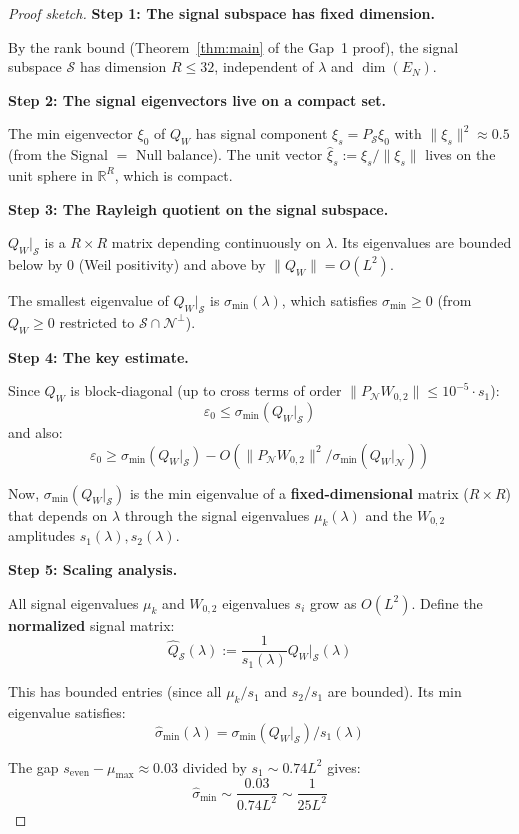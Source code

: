 \documentclass[11pt]{article}
\begin{document}
\begin{proof}[Proof sketch]
\textbf{Step 1: The signal subspace has fixed dimension.}

By the rank bound (Theorem~\ref{thm:main} of the Gap~1 proof), the signal subspace $\mathcal{S}$ has dimension $R \leq 32$, independent of $\lambda$ and $\dim(E_N)$.

\textbf{Step 2: The signal eigenvectors live on a compact set.}

The min eigenvector $\xi_0$ of $Q_W$ has signal component $\xi_s = P_\mathcal{S}\xi_0$ with $\|\xi_s\|^2 \approx 0.5$ (from the Signal $=$ Null balance). The unit vector $\hat{\xi}_s := \xi_s/\|\xi_s\|$ lives on the unit sphere in $\mathbb{R}^R$, which is compact.

\textbf{Step 3: The Rayleigh quotient on the signal subspace.}

$Q_W|_\mathcal{S}$ is a $R \times R$ matrix depending continuously on $\lambda$. Its eigenvalues are bounded below by $0$ (Weil positivity) and above by $\|Q_W\| = O(L^2)$.

The smallest eigenvalue of $Q_W|_\mathcal{S}$ is $\sigma_{\min}(\lambda)$, which satisfies $\sigma_{\min} \geq 0$ (from $Q_W \geq 0$ restricted to $\mathcal{S} \cap \mathcal{N}^\perp$).

\textbf{Step 4: The key estimate.}

Since $Q_W$ is block-diagonal (up to cross terms of order $\|P_\mathcal{N}W_{0,2}\| \leq 10^{-5} \cdot s_1$):
\[
\varepsilon_0 \leq \sigma_{\min}(Q_W|_\mathcal{S})
\]
and also:
\[
\varepsilon_0 \geq \sigma_{\min}(Q_W|_\mathcal{S}) - O(\|P_\mathcal{N}W_{0,2}\|^2 / \sigma_{\min}(Q_W|_\mathcal{N}))
\]

Now, $\sigma_{\min}(Q_W|_\mathcal{S})$ is the min eigenvalue of a \textbf{fixed-dimensional} matrix ($R \times R$) that depends on $\lambda$ through the signal eigenvalues $\mu_k(\lambda)$ and the $W_{0,2}$ amplitudes $s_1(\lambda), s_2(\lambda)$.

\textbf{Step 5: Scaling analysis.}

All signal eigenvalues $\mu_k$ and $W_{0,2}$ eigenvalues $s_i$ grow as $O(L^2)$. Define the \textbf{normalized} signal matrix:
\[
\hat{Q}_\mathcal{S}(\lambda) := \frac{1}{s_1(\lambda)} Q_W|_\mathcal{S}(\lambda)
\]

This has bounded entries (since all $\mu_k/s_1$ and $s_2/s_1$ are bounded). Its min eigenvalue satisfies:
\[
\hat{\sigma}_{\min}(\lambda) = \sigma_{\min}(Q_W|_\mathcal{S}) / s_1(\lambda)
\]

The gap $s_{\mathrm{even}} - \mu_{\max} \approx 0.03$ divided by $s_1 \sim 0.74 L^2$ gives:
\[
\hat{\sigma}_{\min} \sim \frac{0.03}{0.74 L^2} \sim \frac{1}{25 L^2}
\]


\end{proof}
\end{document}
